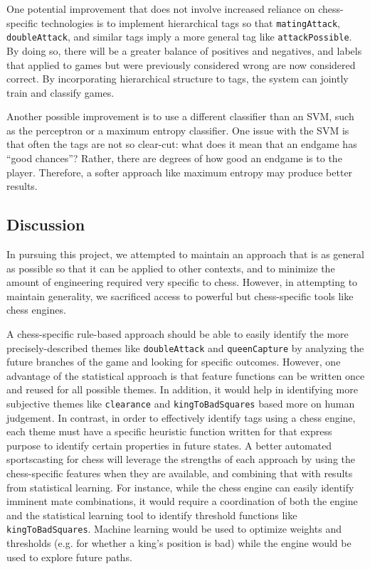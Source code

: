 \documentclass[11pt]{article}
\begin{document}
One potential improvement that does not involve increased reliance on chess-specific technologies is to implement hierarchical tags so that {\tt matingAttack}, {\tt doubleAttack}, and similar tags imply a more general tag like {\tt attackPossible}. By doing so, there will be a greater balance of positives and negatives, and labels that applied to games but were previously considered wrong are now considered correct. By incorporating hierarchical structure to tags, the system can jointly train and classify games.

Another possible improvement is to use a different classifier than an SVM, such as the perceptron or a maximum entropy classifier. One issue with the SVM is that often the tags are not so clear-cut: what does it mean that an endgame has “good chances”? Rather, there are degrees of how good an endgame is to the player. Therefore, a softer approach like maximum entropy may produce better results.

\subsection{Discussion}
In pursuing this project, we attempted to maintain an approach that is as general as possible so that it can be applied to other contexts, and to minimize the amount of engineering required very specific to chess. However, in attempting to maintain generality, we sacrificed access to powerful but chess-specific tools like chess engines.%

A chess-specific rule-based approach should be able to easily identify the more precisely-described themes like {\tt doubleAttack} and {\tt queenCapture} by analyzing the future branches of the game and looking for specific outcomes. However, one advantage of the statistical approach is that feature functions can be written once and reused for all possible themes. In addition, it would help in identifying more subjective themes like {\tt clearance} and {\tt kingToBadSquares} based more on human judgement. In contrast, in order to effectively identify tags using a chess engine, each theme must have a specific heuristic function written for that express purpose to identify certain properties in future states. A better automated sportscasting for chess will leverage the strengths of each approach by using the chess-specific features when they are available, and combining that with results from statistical learning. For instance, while the chess engine can easily identify imminent mate combinations, it would require a coordination of both the engine and the statistical learning tool to identify threshold functions like {\tt kingToBadSquares}. Machine learning would be used to optimize weights and thresholds (e.g. for whether a king’s position is bad) while the engine would be used to explore future paths.
\end{document}
